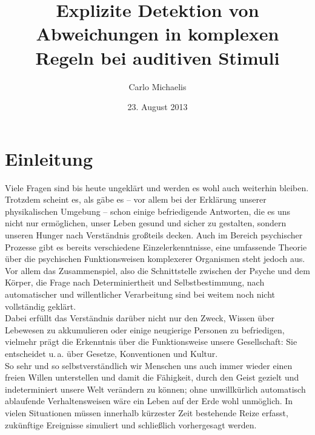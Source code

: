 \documentclass[doc,a4paper,12pt]{apa6}
\title{Explizite Detektion von Abweichungen in komplexen Regeln bei auditiven Stimuli}
\author{Carlo Michaelis}
\date{23. August 2013}
\affiliation{Universität Leipzig}
\begin{document}

\setcounter{tocdepth}{2}
\tableofcontents
\newpage

\section{Einleitung}

Viele Fragen sind bis heute ungeklärt und werden es wohl auch weiterhin bleiben. Trotzdem scheint es, als gäbe es – vor allem bei der Erklärung unserer physikalischen Umgebung – schon einige befriedigende Antworten, die es uns nicht nur ermöglichen, unser Leben gesund und sicher zu gestalten, sondern unseren Hunger nach Verständnis großteils decken. Auch im Bereich psychischer Prozesse gibt es bereits verschiedene Einzelerkenntnisse, eine umfassende Theorie über die psychischen Funktionsweisen komplexerer Organismen steht jedoch aus. Vor allem das Zusammenspiel, also die Schnittstelle zwischen der Psyche und dem Körper, die Frage nach Determiniertheit und Selbstbestimmung, nach automatischer und willentlicher Verarbeitung sind bei weitem noch nicht vollständig geklärt.\\
Dabei erfüllt das Verständnis darüber nicht nur den Zweck, Wissen über Lebewesen zu akkumulieren oder einige neugierige Personen zu befriedigen, vielmehr prägt die Erkenntnis über die Funktionsweise unsere Gesellschaft: Sie entscheidet u.\,a. über Gesetze, Konventionen und Kultur.\\
So sehr und so selbstverständlich wir Menschen uns auch immer wieder einen freien Willen unterstellen und damit die Fähigkeit, durch den Geist gezielt und indeterminiert unsere Welt verändern zu können; ohne unwillkürlich automatisch ablaufende Verhaltensweisen wäre ein Leben auf der Erde wohl unmöglich. In vielen Situationen müssen innerhalb kürzester Zeit bestehende Reize erfasst, zukünftige Ereignisse simuliert und schließlich vorhergesagt werden.
\end{document}
